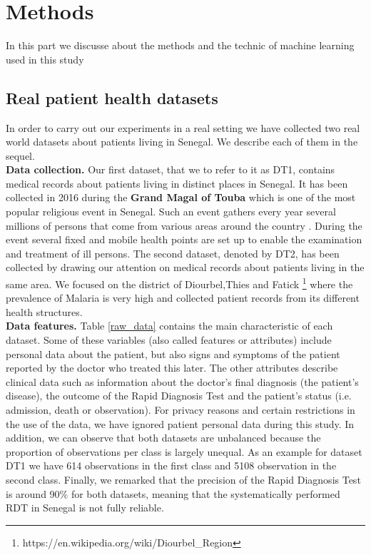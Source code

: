 \section{Methods}\label{Methods}
In this part we discusse about the methods and the technic of machine learning used in this study
\subsection{Real patient health datasets}\label{datasets}
In order to carry out  our experiments in a real setting we have collected two real world datasets about patients living in Senegal. We describe each of them in the sequel.\\
\textbf{Data collection.} Our first dataset, that we  to refer to it as DT1, contains medical records about patients living in distinct places in Senegal. It has been collected in 2016 during the \textbf{Grand Magal of Touba}  which is one of the most popular religious event in Senegal. Such an event gathers every year several millions of persons that come from various areas around the country \cite{Ch17}.  During the event several fixed and mobile health points are set up to enable the examination and treatment of ill persons. The second dataset, denoted by DT2, has been collected by drawing our attention on medical records about patients living in the same area. We focused on the district of Diourbel,Thies and Fatick \footnote{https://en.wikipedia.org/wiki/Diourbel\_Region} where the prevalence of Malaria is very high and collected patient records from its different health structures. \\
\textbf{Data features. } Table \ref{raw_data} contains the main characteristic of each dataset. Some of these variables (also called features or attributes) include personal data about the patient, but also signs and symptoms of the patient reported by the doctor who treated this later. The other attributes describe clinical data such as information about the doctor's final diagnosis (the patient's disease), the outcome of the Rapid Diagnosis Test and the patient's status (i.e. admission, death or observation). For privacy reasons and certain restrictions in the use of the data, we have ignored patient personal data  during this study.
In addition, we can observe that  both datasets are unbalanced because the proportion of observations per class is largely unequal. As an example for dataset DT1 we have 614 observations in the first class and 5108 observation in the second class. Finally, we remarked that the precision of the Rapid Diagnosis Test is around 90\% for both datasets, meaning that the systematically performed RDT in Senegal is not fully reliable.

